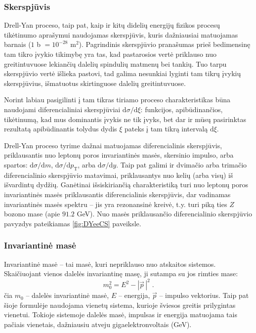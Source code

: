 \documentclass[a4paper, 12pt]{article}
\newlength\q
\begin{document}
\subsubsection{Skerspjūvis}

Drell-Yan proceso, taip pat, kaip ir kitų didelių energijų fizikos procesų tikėtinumo aprašymui
naudojamas skerspjūvis, kuris dažniausiai matuojamas barnais ($1$ b $= 10^{-28}$ m$^{2}$).
Pagrindinis skerspjūvio pranašumas prieš bedimensinę tam tikro įvykio tikimybę yra tas, kad
pastarosios vertė priklauso nuo greitintuvuose lekiančių dalelių spindulių matmenų bei tankių.
Tuo tarpu skerspjūvio vertė išlieka pastovi, tad galima nesunkiai lyginti tam tikrų įvykių
skerspjūvius, išmatuotus skirtinguose dalelių greitintuvuose.

Norint labiau pasigilinti į tam tikras tiriamo proceso charakteristikas būna naudojami diferencialiniai
skerspjūviai $\mathrm{d}\sigma/\mathrm{d}\xi$: funkcijos, apibūdinančios, tikėtinumą, kad mus
dominantis įvykis ne tik įvyks, bet dar ir mūsų pasirinktas rezultatą apibūdinantis tolydus
dydis $\xi$ pateks į tam tikrą intervalą $\mathrm{d}\xi$.

Drell-Yan proceso tyrime dažnai matuojamas diferencialinis skerspjūvis, priklausantis nuo
leptonų poros invariantinės masės, skersinio impulso, arba spartos:
$\mathrm{d}\sigma / \mathrm{d}m$, $\mathrm{d}\sigma / \mathrm{d}p_{\mathrm{T}}$, arba
$\mathrm{d}\sigma / \mathrm{d}y$.
Taip pat galimi ir dvimačio arba trimačio diferencialinio skerspjūvio matavimai,
priklausantys nuo kelių (arba visų) iš išvardintų dydžių.
Ganėtinai išsiskiriančią charakteristiką turi nuo leptonų poros invariantinės masės priklausantis
diferencialinis skerspjūvis, dar vadinamas invariantinės masės spektru -- jis yra rezonansinė
kreivė, t.y. turi piką ties $Z$ bozono mase (apie $91.2$ GeV).
Nuo masės priklausančio diferencialinio skerspjūvio pavyzdys pateikiamas \ref{fig:DYeeCS} paveiksle.


\subsubsection*{Invariantinė masė} 

Invariantinė masė -- tai masė, kuri nepriklauso nuo atskaitos sistemos.
Skaičiuojant vienos dalelės invariantinę masę, ji sutampa su jos rimties mase:
\begin{equation}
	m_{0}^{2} = E^{2} - | \vec{p}\, |^{2} \; .
	\label{eq:invm}
\end{equation}
čia $m_{0}$ -- dalelės invariantinė masė, $E$ -- energija, $\vec{p}$ -- impulso vektorius.
Taip pat šioje formulėje naudojama vienetų sistema, kurioje šviesos greitis prilygintas vienetui.
Tokioje sistemoje dalelės masė, impulsas ir energija matuojama tais pačiais vienetais, dažniausiu atveju
gigaelektronvoltais (GeV).
\end{document}
